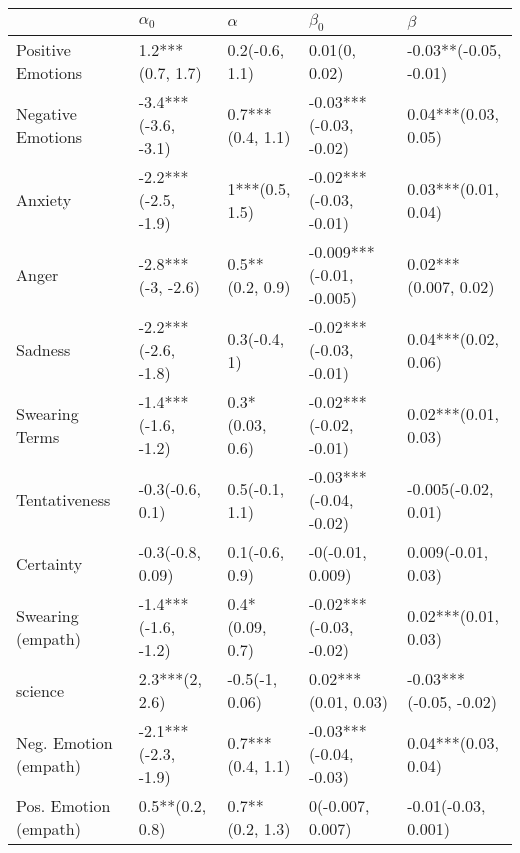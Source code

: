 \begin{tabular}{lllll}
\toprule
{} &           $\alpha_0$ &          $\alpha$ &                 $\beta_0$ &                 $\beta$ \\
\midrule
Positive Emotions     &     1.2***(0.7, 1.7) &    0.2(-0.6, 1.1) &             0.01(0, 0.02) &   -0.03**(-0.05, -0.01) \\
Negative Emotions     &  -3.4***(-3.6, -3.1) &  0.7***(0.4, 1.1) &    -0.03***(-0.03, -0.02) &     0.04***(0.03, 0.05) \\
Anxiety               &  -2.2***(-2.5, -1.9) &    1***(0.5, 1.5) &    -0.02***(-0.03, -0.01) &     0.03***(0.01, 0.04) \\
Anger                 &    -2.8***(-3, -2.6) &   0.5**(0.2, 0.9) &  -0.009***(-0.01, -0.005) &    0.02***(0.007, 0.02) \\
Sadness               &  -2.2***(-2.6, -1.8) &      0.3(-0.4, 1) &    -0.02***(-0.03, -0.01) &     0.04***(0.02, 0.06) \\
Swearing Terms        &  -1.4***(-1.6, -1.2) &   0.3*(0.03, 0.6) &    -0.02***(-0.02, -0.01) &     0.02***(0.01, 0.03) \\
Tentativeness         &      -0.3(-0.6, 0.1) &    0.5(-0.1, 1.1) &    -0.03***(-0.04, -0.02) &     -0.005(-0.02, 0.01) \\
Certainty             &     -0.3(-0.8, 0.09) &    0.1(-0.6, 0.9) &          -0(-0.01, 0.009) &      0.009(-0.01, 0.03) \\
Swearing (empath)     &  -1.4***(-1.6, -1.2) &   0.4*(0.09, 0.7) &    -0.02***(-0.03, -0.02) &     0.02***(0.01, 0.03) \\
science               &       2.3***(2, 2.6) &    -0.5(-1, 0.06) &       0.02***(0.01, 0.03) &  -0.03***(-0.05, -0.02) \\
Neg. Emotion (empath) &  -2.1***(-2.3, -1.9) &  0.7***(0.4, 1.1) &    -0.03***(-0.04, -0.03) &     0.04***(0.03, 0.04) \\
Pos. Emotion (empath) &      0.5**(0.2, 0.8) &   0.7**(0.2, 1.3) &          0(-0.007, 0.007) &     -0.01(-0.03, 0.001) \\
\bottomrule
\end{tabular}
